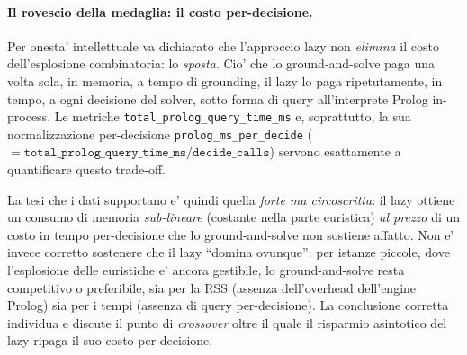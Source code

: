 \paragraph{Il rovescio della medaglia: il costo per-decisione.}
Per onesta' intellettuale va dichiarato che l'approccio lazy non \emph{elimina}
il costo dell'esplosione combinatoria: lo \emph{sposta}. Cio' che lo
ground-and-solve paga una volta sola, in memoria, a tempo di grounding, il lazy
lo paga ripetutamente, in tempo, a ogni decisione del solver, sotto forma di
query all'interprete Prolog in-process. Le metriche
\texttt{total\_prolog\_query\_time\_ms} e, soprattutto, la sua normalizzazione
per-decisione \texttt{prolog\_ms\_per\_decide}
($=\texttt{total\_prolog\_query\_time\_ms}/\texttt{decide\_calls}$) servono
esattamente a quantificare questo trade-off.

La tesi che i dati supportano e' quindi quella \emph{forte ma circoscritta}:
il lazy ottiene un consumo di memoria \emph{sub-lineare} (costante nella parte
euristica) \emph{al prezzo} di un costo in tempo per-decisione che lo
ground-and-solve non sostiene affatto. Non e' invece corretto sostenere che il
lazy ``domina ovunque'': per istanze piccole, dove l'esplosione delle euristiche
e' ancora gestibile, lo ground-and-solve resta competitivo o preferibile, sia
per la RSS (assenza dell'overhead dell'engine Prolog) sia per i tempi (assenza
di query per-decisione). La conclusione corretta individua e discute il punto di
\emph{crossover} oltre il quale il risparmio asintotico del lazy ripaga il suo
costo per-decisione.

